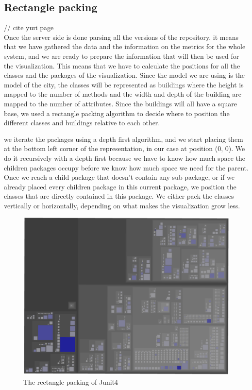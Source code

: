 \documentclass[]{usiinfbachelorproject}
\begin{document}
\subsection{Rectangle packing} \label{Rectangle packing}
// cite yuri page\\
Once the server side is done parsing all the versions of the repository, it means that  we have gathered the data and the information on the metrics for the whole system, and we are ready to prepare the information that will then be used for the visualization. This means that we have to calculate the positions for all the classes and the packages of the visualization. Since the model we are using is the model of the city, the classes will be represented as buildings where the height is mapped to the number of methods and the width and depth of the building are mapped to the number of attributes. Since the buildings will all have a square base, we used a rectangle packing algorithm to decide where to position the different classes and buildings relative to each other.

we iterate the packages using a depth first algorithm, and we start placing them at the bottom left corner of the representation, in our case at position (0, 0). We do it recursively with a depth first because we have to know how much space the children packages occupy before we know how much space we need for the parent.
Once we reach a child package that doesn't contain any sub-package, or if we already placed every children package in this current package, we position the classes that are directly contained in this package. We either pack the classes vertically or horizontally, depending on what makes the visualization grow less.

\begin{figure} [H]
\centering
\includegraphics[width=.7\textwidth]{pictures/junit4Above.png}
\caption{The rectangle packing of Junit4}
\label{fig:flow}
\end{figure}
\end{document}
